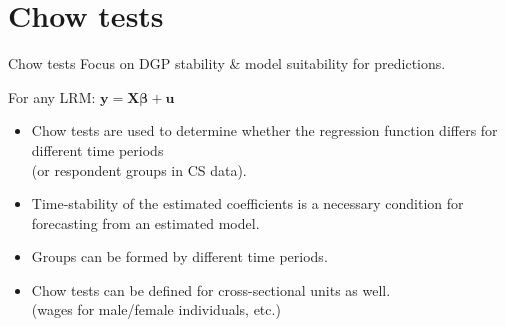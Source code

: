 \documentclass{beamer}
\begin{document}
\section{Chow tests}
\begin{frame}{Chow tests}
Focus on DGP stability \& model suitability for predictions.

\medskip
For any LRM: $\bm{y} = \bm{X\beta}+\bm{u}$
\vspace{0.3cm}
\begin{itemize}
\item Chow tests are used to determine whether the regression function differs for different time periods \\(or respondent groups in CS data). 
\item Time-stability of the estimated coefficients is a necessary condition for forecasting from an estimated model.
\item Groups can be formed by different time periods.

\item Chow tests can be defined for cross-sectional units as well. \\(wages for male/female individuals, etc.)
\end{itemize}

\end{frame}

\end{document}
